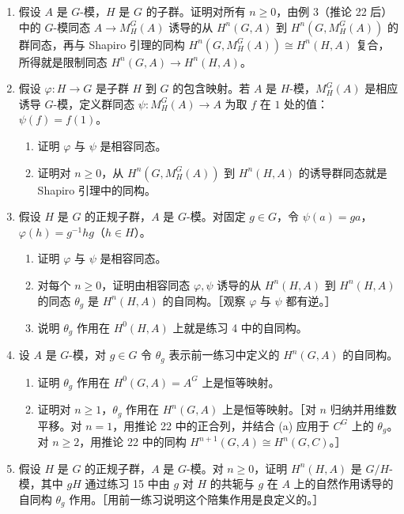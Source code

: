 \begin{enumerate}[label=\arabic*.]
  \item 假设 $A$ 是 $G$-模，$H$ 是 $G$ 的子群。证明对所有 $n\geq0$，由例 3（推论 22 后）中的 $G$-模同态 $A\to M_H^G(A)$ 诱导的从 $H^n(G,A)$ 到 $H^n(G,M_H^G(A))$ 的群同态，再与 Shapiro 引理的同构 $H^n(G,M_H^G(A))\cong H^n(H,A)$ 复合，所得就是限制同态 $H^n(G,A)\to H^n(H,A)$。

  \item 假设 $\varphi:H\to G$ 是子群 $H$ 到 $G$ 的包含映射。若 $A$ 是 $H$-模，$M_H^G(A)$ 是相应诱导 $G$-模，定义群同态 $\psi:M_H^G(A)\to A$ 为取 $f$ 在 $1$ 处的值：$\psi(f)=f(1)$。
  \begin{enumerate}[label=(\alph*)]
    \item 证明 $\varphi$ 与 $\psi$ 是相容同态。
    \item 证明对 $n\geq0$，从 $H^n(G,M_H^G(A))$ 到 $H^n(H,A)$ 的诱导群同态就是 Shapiro 引理中的同构。
  \end{enumerate}

  \item 假设 $H$ 是 $G$ 的正规子群，$A$ 是 $G$-模。对固定 $g\in G$，令 $\psi(a)=ga$，$\varphi(h)=g^{-1}hg$（$h\in H$）。
  \begin{enumerate}[label=(\alph*)]
    \item 证明 $\varphi$ 与 $\psi$ 是相容同态。
    \item 对每个 $n\geq0$，证明由相容同态 $\varphi,\psi$ 诱导的从 $H^n(H,A)$ 到 $H^n(H,A)$ 的同态 $\theta_g$ 是 $H^n(H,A)$ 的自同构。［观察 $\varphi$ 与 $\psi$ 都有逆。］
    \item 说明 $\theta_g$ 作用在 $H^0(H,A)$ 上就是练习 4 中的自同构。
  \end{enumerate}

  \item 设 $A$ 是 $G$-模，对 $g\in G$ 令 $\theta_g$ 表示前一练习中定义的 $H^n(G,A)$ 的自同构。
  \begin{enumerate}[label=(\alph*)]
    \item 证明 $\theta_g$ 作用在 $H^0(G,A)=A^G$ 上是恒等映射。
    \item 证明对 $n\geq1$，$\theta_g$ 作用在 $H^n(G,A)$ 上是恒等映射。［对 $n$ 归纳并用维数平移。对 $n=1$，用推论 22 中的正合列，并结合 (a) 应用于 $C^G$ 上的 $\theta_g$。对 $n\geq2$，用推论 22 中的同构 $H^{n+1}(G,A)\cong H^n(G,C)$。］
  \end{enumerate}

  \item 假设 $H$ 是 $G$ 的正规子群，$A$ 是 $G$-模。对 $n\geq0$，证明 $H^n(H,A)$ 是 $G/H$-模，其中 $gH$ 通过练习 15 中由 $g$ 对 $H$ 的共轭与 $g$ 在 $A$ 上的自然作用诱导的自同构 $\theta_g$ 作用。［用前一练习说明这个陪集作用是良定义的。］


\end{enumerate}
